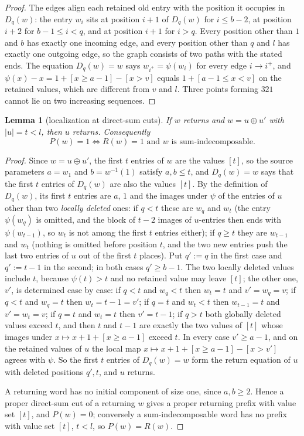 \documentclass[11pt,reqno]{amsart}
\theoremstyle{plain}
\newtheorem{lemma}[lemma]{Lemma}
\theoremstyle{definition}
\theoremstyle{remark}
\begin{document}
\begin{proof}
The edges align each retained old entry with the position it occupies in $D_q(w)$: the entry $w_i$ sits at position $i+1$ of $D_q(w)$ for $i\le b-2$, at position $i+2$ for $b-1\le i<q$, and at position $i+1$ for $i>q$. Every position other than $1$ and $b$ has exactly one incoming edge, and every position other than $q$ and $l$ has exactly one outgoing edge, so the graph consists of two paths with the stated ends. The equation $D_q(w)=w$ says $w_{i^+}=\psi(w_i)$ for every edge $i\to i^+$, and $\psi(x)-x=1+[x\ge a-1]-[x>v]$ equals $1+[a-1\le x<v]$ on the retained values, which are different from $v$ and $l$. Three points forming $321$ cannot lie on two increasing sequences.
\end{proof}

\begin{lemma}[localization at direct-sum cuts]\label{lem:localize}
If $w$ returns and $w=u\oplus u'$ with $|u|=t<l$, then $u$ returns. Consequently
\begin{equation}\label{eq:Pchar}
P(w)=1\iff R(w)=1\text{ and }w\text{ is sum-indecomposable}.
\end{equation}
\end{lemma}

\begin{proof}
Since $w=u\oplus u'$, the first $t$ entries of $w$ are the values $[t]$, so the source parameters $a=w_1$ and $b=w^{-1}(1)$ satisfy $a,b\le t$, and $D_q(w)=w$ says that the first $t$ entries of $D_q(w)$ are also the values $[t]$. By the definition of $D_q(w)$, its first $t$ entries are $a$, $1$ and the images under $\psi$ of the entries of $u$ other than two \emph{locally deleted} ones: if $q<t$ these are $w_q$ and $w_t$ (the entry $\psi(w_q)$ is omitted, and the block of $t-2$ images of $u$-entries then ends with $\psi(w_{t-1})$, so $w_t$ is not among the first $t$ entries either); if $q\ge t$ they are $w_{t-1}$ and $w_t$ (nothing is omitted before position $t$, and the two new entries push the last two entries of $u$ out of the first $t$ places). Put $q':=q$ in the first case and $q':=t-1$ in the second; in both cases $q'\ge b-1$. The two locally deleted values include $t$, because $\psi(t)>t$ and no retained value may leave $[t]$; the other one, $v'$, is determined case by case: if $q<t$ and $w_q<t$ then $w_t=t$ and $v'=w_q=v$; if $q<t$ and $w_q=t$ then $w_t=t-1=v'$; if $q=t$ and $w_t<t$ then $w_{t-1}=t$ and $v'=w_t=v$; if $q=t$ and $w_t=t$ then $v'=t-1$; if $q>t$ both globally deleted values exceed $t$, and then $t$ and $t-1$ are exactly the two values of $[t]$ whose images under $x\mapsto x+1+[x\ge a-1]$ exceed $t$. In every case $v'\ge a-1$, and on the retained values of $u$ the local map $x\mapsto x+1+[x\ge a-1]-[x>v']$ agrees with $\psi$. So the first $t$ entries of $D_q(w)=w$ form the return equation of $u$ with deleted positions $q',t$, and $u$ returns.

A returning word has no initial component of size one, since $a,b\ge2$. Hence a proper direct-sum cut of a returning $w$ gives a proper returning prefix with value set $[t]$, and $P(w)=0$; conversely a sum-indecomposable word has no prefix with value set $[t]$, $t<l$, so $P(w)=R(w)$.
\end{proof}
\end{document}
